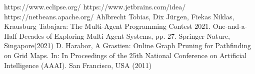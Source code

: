 
\begin{thebibliography}{8}
	 https://www.eclipse.org/
	 https://www.jetbrains.com/idea/
	 https://netbeans.apache.org/
	 Ahlbrecht Tobias, Dix Jürgen, Fiekas Niklas, Krausburg Tabajara: The Multi-Agent Programming Contest 2021. One-and-a-Half Decades of Exploring Multi-Agent Systems, pp. 27. Springer Nature, Singapore(2021)
	D. Harabor, A Grastien: Online Graph Pruning for Pathfinding on Grid Maps. In: In Proceedings of the 25th National Conference on Artificial Intelligence (AAAI). San Francisco, USA (2011)

	
\end{thebibliography}